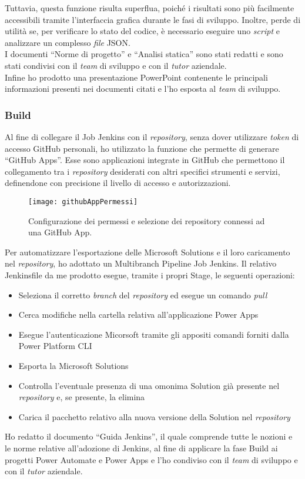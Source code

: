 Tuttavia, questa funzione risulta superflua, poiché i risultati sono più facilmente accessibili tramite l'interfaccia grafica durante le fasi di sviluppo. Inoltre, perde di utilità se, per verificare lo stato del codice, è necessario eseguire uno \emph{script} e analizzare un complesso \emph{file} JSON.\\ 
I documenti “Norme di progetto” e “Analisi statica” sono stati redatti e sono stati condivisi con il \emph{team} di sviluppo e con il \emph{\emph{tutor}} aziendale.\\  
Infine ho prodotto una presentazione PowerPoint contenente le principali informazioni presenti nei documenti citati e l'ho esposta al \emph{team} di sviluppo. 

\subsubsection*{Build}
Al fine di collegare il Job Jenkins con il \emph{repository}, senza dover utilizzare \emph{token} di accesso GitHub personali, ho utilizzato la funzione che permette di generare “GitHub Apps”. Esse sono applicazioni integrate in GitHub che permettono il collegamento tra i \emph{repository} desiderati con altri specifici strumenti e servizi, definendone con precisione il livello di accesso e autorizzazioni.  
\begin{figure}[htbp] 
    \centering 
    \texttt{[image: githubAppPermessi]} 
    \caption{Configurazione dei permessi e selezione dei repository connessi ad una GitHub App.}
    \label{fig:githubAppPermessi}
\end{figure}
\newline Per automatizzare l'esportazione delle Microsoft Solutions e il loro caricamento nel \emph{repository}, ho adottato un Multibranch Pipeline Job Jenkins. Il relativo Jenkinsfile da me prodotto esegue, tramite i propri Stage, le seguenti operazioni:
\begin{itemize}
    \item Seleziona il corretto \emph{branch} del \emph{repository} ed esegue un comando \emph{pull}
    \item Cerca modifiche nella cartella relativa all'applicazione Power Apps
    \item Esegue l'autenticazione Micorsoft tramite gli appositi comandi forniti dalla Power Platform CLI
    \item Esporta la Microsoft Solutions
    \item Controlla l'eventuale presenza di una omonima Solution già presente nel \emph{repository} e, se presente, la elimina 
    \item Carica il pacchetto relativo alla nuova versione della Solution nel \emph{repository}
\end{itemize}
Ho redatto il documento “Guida Jenkins”, il quale comprende tutte le nozioni e le norme relative all'adozione di Jenkins, al fine di applicare la fase Build ai progetti Power Automate e Power Apps e l'ho condiviso con il \emph{team} di sviluppo e con il \emph{\emph{tutor}} aziendale.

